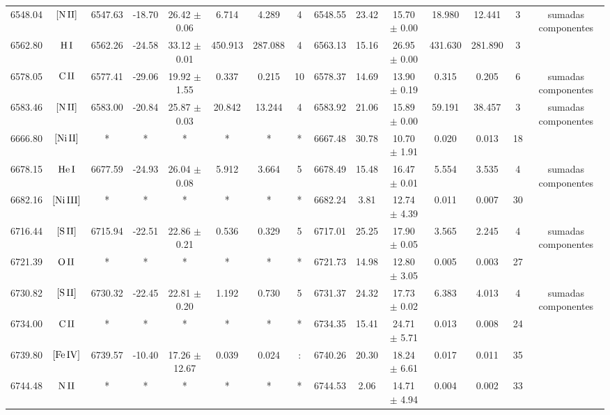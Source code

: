 \documentclass{article}
\begin{document}
\begin{table*}
\begin{adjustbox}{width=\textwidth}
\begin{tabular}{ccccccccccccccc}
6548.04 & $\mbox{[N}\thinspace \mbox{II]}$ & 6547.63 & -18.70 & 26.42 $\pm$ 0.06 & 6.714 & 4.289 & 4 & 6548.55 & 23.42 & 15.70 $\pm$ 0.00 & 18.980 & 12.441 & 3 &  sumadas componentes \\
6562.80 & $\mbox{H}\thinspace \mbox{I}$ & 6562.26 & -24.58 & 33.12 $\pm$ 0.01 & 450.913 & 287.088 & 4 & 6563.13 & 15.16 & 26.95 $\pm$ 0.00 & 431.630 & 281.890 & 3 &  \\
6578.05 & $\mbox{C}\thinspace \mbox{II}$ & 6577.41 & -29.06 & 19.92 $\pm$ 1.55 & 0.337 & 0.215 & 10 & 6578.37 & 14.69 & 13.90 $\pm$ 0.19 & 0.315 & 0.205 & 6 &  sumadas componentes \\
6583.46 & $\mbox{[N}\thinspace \mbox{II]}$ & 6583.00 & -20.84 & 25.87 $\pm$ 0.03 & 20.842 & 13.244 & 4 & 6583.92 & 21.06 & 15.89 $\pm$ 0.00 & 59.191 & 38.457 & 3 &  sumadas componentes \\
6666.80 & $\mbox{[Ni}\thinspace \mbox{II]}$ & * & * & * & * & * & * & 6667.48 & 30.78 & 10.70 $\pm$ 1.91 & 0.020 & 0.013 & 18 &  \\
6678.15 & $\mbox{He}\thinspace \mbox{I}$ & 6677.59 & -24.93 & 26.04 $\pm$ 0.08 & 5.912 & 3.664 & 5 & 6678.49 & 15.48 & 16.47 $\pm$ 0.01 & 5.554 & 3.535 & 4 &  sumadas componentes \\
6682.16 & $\mbox{[Ni}\thinspace \mbox{III]}$ & * & * & * & * & * & * & 6682.24 & 3.81 & 12.74 $\pm$ 4.39 & 0.011 & 0.007 & 30 &  \\
6716.44 & $\mbox{[S}\thinspace \mbox{II]}$ & 6715.94 & -22.51 & 22.86 $\pm$ 0.21 & 0.536 & 0.329 & 5 & 6717.01 & 25.25 & 17.90 $\pm$ 0.05 & 3.565 & 2.245 & 4 &  sumadas componentes \\
6721.39 & $\mbox{O}\thinspace \mbox{II}$ & * & * & * & * & * & * & 6721.73 & 14.98 & 12.80 $\pm$ 3.05 & 0.005 & 0.003 & 27 &  \\
6730.82 & $\mbox{[S}\thinspace \mbox{II]}$ & 6730.32 & -22.45 & 22.81 $\pm$ 0.20 & 1.192 & 0.730 & 5 & 6731.37 & 24.32 & 17.73 $\pm$ 0.02 & 6.383 & 4.013 & 4 &  sumadas componentes \\
6734.00 & $\mbox{C}\thinspace \mbox{II}$ & * & * & * & * & * & * & 6734.35 & 15.41 & 24.71 $\pm$ 5.71 & 0.013 & 0.008 & 24 &  \\
6739.80 & $\mbox{[Fe}\thinspace \mbox{IV]}$ & 6739.57 & -10.40 & 17.26 $\pm$ 12.67 & 0.039 & 0.024 & : & 6740.26 & 20.30 & 18.24 $\pm$ 6.61 & 0.017 & 0.011 & 35 &  \\
6744.48 & $\mbox{N}\thinspace \mbox{II}$ & * & * & * & * & * & * & 6744.53 & 2.06 & 14.71 $\pm$ 4.94 & 0.004 & 0.002 & 33 &  \\

\end{tabular}
\end{adjustbox}
\end{table*}
\end{document}
